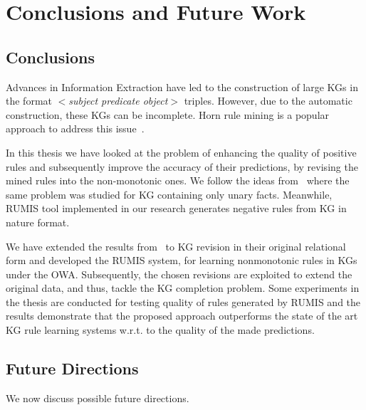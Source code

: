 \chapter{Conclusions and Future Work}
\label{chap:conclusion}

\section{Conclusions}

Advances in Information Extraction have led to the construction of large KGs in the format \textit{$<$subject predicate object$>$} triples. However, due to the automatic construction, these KGs can be incomplete. Horn rule mining is a popular approach to address this issue~\cite{ref10}.

In this thesis we have looked at the problem of enhancing the quality of positive rules and subsequently improve the accuracy of their predictions, by revising the mined rules into the non-monotonic ones. We follow the ideas from~\cite{ref12} where the same problem was studied for KG containing only unary facts. Meanwhile, RUMIS tool implemented in our research generates negative rules from KG in nature format.

We have extended the results from~\cite{ref12} to KG revision in their original relational form and developed the RUMIS system, for learning nonmonotonic rules in KGs under the OWA. Subsequently, the chosen revisions are exploited to extend the original data, and thus, tackle the KG completion problem. Some experiments in the thesis are conducted for testing quality of rules generated by RUMIS and the results demonstrate that the proposed approach outperforms the state of the art KG rule learning systems w.r.t. to the quality of the made predictions.

\section{Future Directions}

We now discuss possible future directions.

